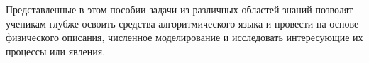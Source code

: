 Представленные в этом пособии задачи из различных областей знаний позволят ученикам глубже освоить средства алгоритмического языка и провести на основе физического описания, 
численное моделирование и исследовать интересующие их процессы или явления. 


